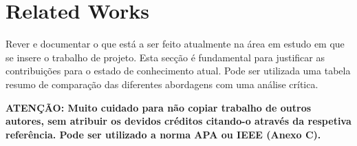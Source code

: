 \section{Related Works} %
\label{sec:related_works}

Rever e documentar o que está a ser feito atualmente na área em estudo em que se insere o trabalho de projeto. Esta secção é fundamental para justificar as contribuições para o estado de conhecimento atual. Pode ser utilizada uma tabela resumo de comparação das diferentes abordagens com uma análise crítica.

\vspace{2cm}

\textbf{ATENÇÃO: Muito cuidado para não copiar trabalho de outros autores, sem atribuir os devidos créditos citando-o através da respetiva referência. Pode ser utilizado a norma APA ou IEEE (Anexo C).}

